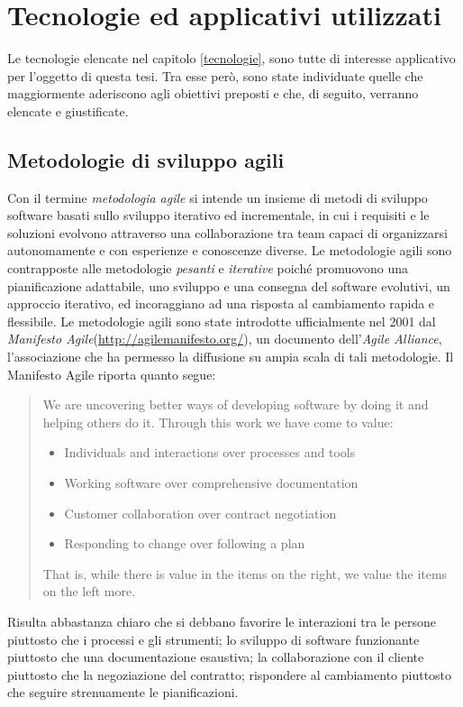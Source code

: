 
\chapter{Tecnologie ed applicativi utilizzati}
\label{tecnologieutilizzate}

Le tecnologie elencate nel capitolo \ref{tecnologie}, sono tutte di interesse applicativo per l'oggetto di questa tesi. Tra esse però, sono state individuate quelle che maggiormente aderiscono agli obiettivi preposti e che, di seguito, verranno elencate e giustificate.
\section{Metodologie di sviluppo agili}
Con il termine \textit{metodologia agile} si intende un insieme di metodi di sviluppo software basati sullo sviluppo iterativo ed incrementale, in cui i requisiti e le soluzioni evolvono attraverso una collaborazione tra team capaci di organizzarsi autonomamente e con esperienze e conoscenze diverse.
Le metodologie agili sono contrapposte alle metodologie \textit{pesanti} e \textit{iterative} poiché promuovono una pianificazione adattabile, uno sviluppo e una consegna del software evolutivi, un approccio iterativo, ed incoraggiano ad una risposta al cambiamento rapida e flessibile.
Le metodologie agili sono state introdotte ufficialmente nel 2001 dal \textit{Manifesto Agile}(\url{http://agilemanifesto.org/}), un documento dell'\textit{Agile Alliance}, l'associazione che ha permesso la diffusione su ampia scala di tali metodologie.
Il Manifesto Agile riporta quanto segue:
\begin{quotation}
We are uncovering better ways of developing software by doing it and helping others do it. Through this work we have come to value:
\begin{itemize}
\item[ ] Individuals and interactions over processes and tools
\item[ ] Working software over comprehensive documentation
\item[ ] Customer collaboration over contract negotiation
\item[ ] Responding to change over following a plan
\end{itemize}
That is, while there is value in the items on the right, we value the items on the left more.
\end{quotation}
Risulta abbastanza chiaro che si debbano favorire le interazioni tra le persone piuttosto che i processi e gli strumenti; lo sviluppo di software funzionante piuttosto che una documentazione esaustiva; la collaborazione con il cliente piuttosto che la negoziazione del contratto; rispondere al cambiamento piuttosto che seguire strenuamente le pianificazioni.

